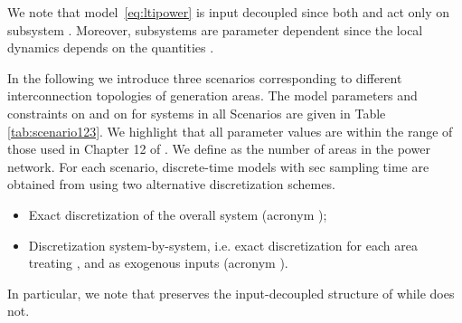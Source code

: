 \documentclass[a4paper]{article}
\begin{document}
          We note that model~\eqref{eq:ltipower} is input decoupled since both  and  act only on subsystem . Moreover, subsystems  are parameter dependent since the local dynamics depends on the quantities . 

          In the following we introduce three scenarios corresponding to different interconnection topologies of generation areas. The model parameters and constraints on  and on  for systems in all Scenarios are given in Table \ref{tab:scenario123}. We highlight that all parameter values are within the range of those used in Chapter 12 of \cite{Saadat2002}. We define  as the number of areas in the power network. For each scenario, discrete-time models  with  sec sampling time are obtained from  using two alternative discretization schemes.
          \begin{itemize}
          \item Exact discretization of the overall system (acronym );
          \item Discretization system-by-system, i.e. exact discretization for each area treating ,  and  as exogenous inputs (acronym ).
          \end{itemize}
          In particular, we note that  preserves the input-decoupled structure of  while  does not.
\end{document}
